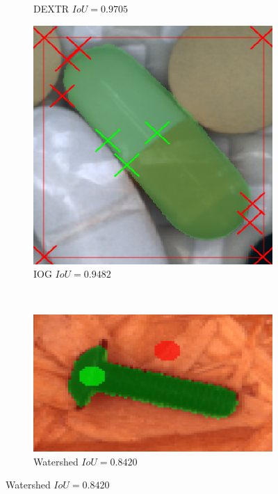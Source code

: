 \begin{figure}
\begin{subfigure}[t]{0.3\textwidth}
		\caption{
			DEXTR $ IoU = 0.9705 $
		}
	\end{subfigure}
	\hfill
	\begin{subfigure}[t]{0.3\textwidth}
		\centering
		\includegraphics[width=\textwidth]{figures/appendix/method_predictions/pill56_iog.png}
		\caption{
			IOG $ IoU = 0.9482 $
		}
	\end{subfigure}
	\\	
	\begin{subfigure}[t]{0.3\textwidth}
		\centering
		\includegraphics[width=\textwidth]{figures/appendix/method_predictions/screw57_watershed.png}
		\caption{
			Watershed $ IoU = 0.8420 $
}
\end{subfigure}
\end{figure}
